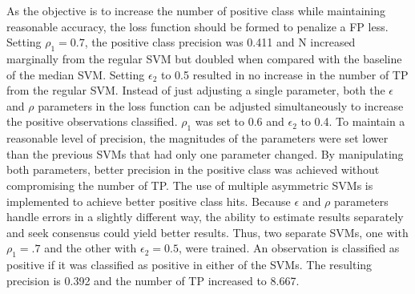 As the objective is to increase the number of positive class while maintaining reasonable accuracy, the loss function should be formed to penalize a FP less. Setting $\rho_1=0.7$, the positive class precision was 0.411 and N increased marginally from the regular SVM but doubled when compared with the baseline of the median SVM. Setting $\epsilon_2$ to 0.5 resulted in no increase in the number of TP from the regular SVM. Instead of just adjusting a single parameter, both the $\epsilon$ and $\rho$ parameters in the loss function can be adjusted simultaneously to increase the positive observations classified. $\rho_1$ was set to 0.6 and $\epsilon_2$ to 0.4. To maintain a reasonable level of precision, the magnitudes of the parameters were set lower than the previous SVMs that had only one parameter changed. By manipulating both parameters, better precision in the positive class was achieved without compromising the number of TP. The use of multiple asymmetric SVMs is implemented to achieve better positive class hits. Because $\epsilon$ and $\rho$ parameters handle errors in a slightly different way, the ability to estimate results separately and seek consensus could yield better results. Thus, two separate SVMs, one with $\rho_1=.7$ and the other with $\epsilon_2=0.5$, were trained. An observation is classified as positive if it was classified as positive in either of the SVMs. The resulting precision is 0.392 and the number of TP increased to 8.667.

